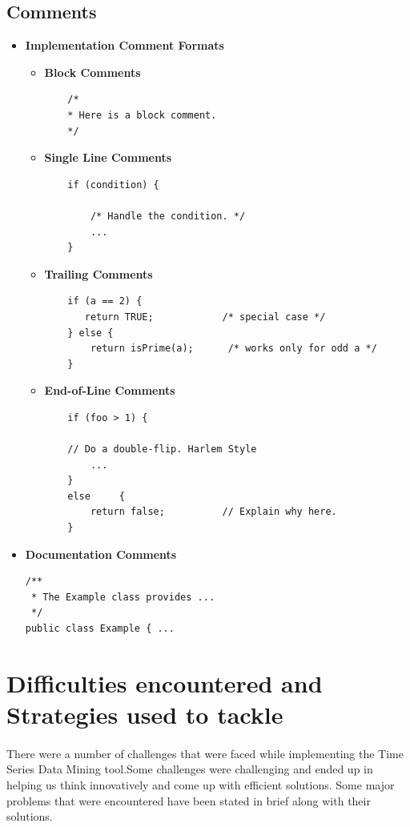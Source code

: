 \documentclass[12pt,a4paper]{report}
\begin{document}
\subsection{Comments}
\begin{itemize}
\item{\textbf{Implementation Comment Formats}}
	\begin{itemize}
	\item \textbf{Block Comments}
	\begin{verbatim}
	/*
 	* Here is a block comment.
 	*/
	\end{verbatim}
	\item \textbf{Single Line Comments}
	\begin{verbatim}
	if (condition) {

    	/* Handle the condition. */
    	...
	}

	\end{verbatim}
	\item \textbf{Trailing Comments}
	\begin{verbatim}
	if (a == 2) {
 	   return TRUE;            /* special case */
	} else {
	    return isPrime(a);      /* works only for odd a */
	}
	\end{verbatim}
	\item \textbf{End-of-Line Comments}
	\begin{verbatim}
	if (foo > 1) {

    // Do a double-flip. Harlem Style
    	...
	}
	else	 {
    	return false;          // Explain why here.	
	}
	\end{verbatim}
	\end{itemize}
\item{\textbf{Documentation Comments}}
\begin{verbatim}
/**
 * The Example class provides ...
 */
public class Example { ...
\end{verbatim}

\end{itemize}
\section{Difficulties encountered and Strategies used to tackle}

\paragraph{}There were a number of challenges that were faced while implementing the Time Series Data Mining tool.Some challenges were challenging and ended up in helping us think innovatively and come up with efficient solutions. Some major problems that were encountered have been stated in brief along with their solutions.
\end{document}

